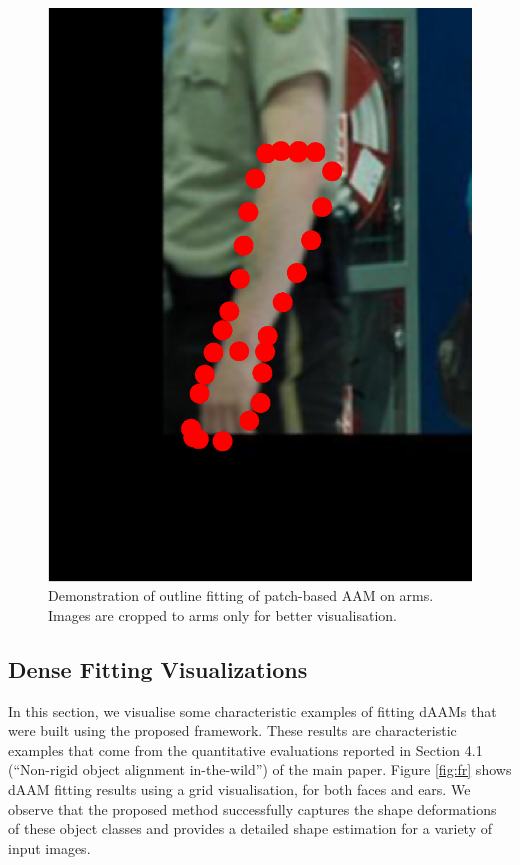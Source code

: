 \begin{figure}[!t]
    \includegraphics[height=\ofh]{Suplementory_Meterial/ExFit/0044.eps}
    \caption{Demonstration of outline fitting of patch-based AAM on arms. Images are cropped to arms only for better visualisation.}
    \label{fig:paam_fittingresults}
\end{figure}


\subsection{Dense Fitting Visualizations}
\label{sec:daam_fittingresults}


In this section, we visualise some characteristic examples of fitting
dAAMs that were built using the proposed framework. These results are characteristic examples that come from the quantitative evaluations reported in Section 4.1 (``Non-rigid object alignment in-the-wild'') of the main paper. Figure \ref{fig:fr} shows dAAM fitting results using a grid visualisation, for both faces and ears. We observe that the proposed method successfully captures the shape deformations of these object classes and provides a detailed shape estimation for a variety of input images.


